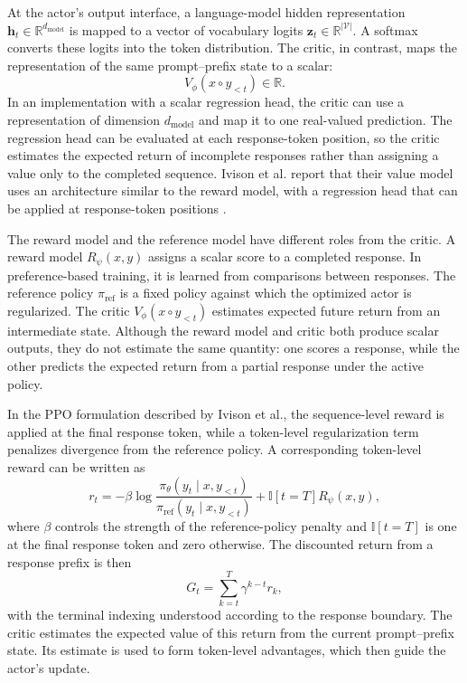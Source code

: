 At the actor's output interface, a language-model hidden representation
\(\mathbf{h}_t\in\mathbb{R}^{d_{\mathrm{model}}}\) is mapped to a vector of
vocabulary logits
\(\mathbf{z}_t\in\mathbb{R}^{|\mathcal{V}|}\). A softmax converts these
logits into the token distribution. The critic, in contrast, maps the
representation of the same prompt--prefix state to a scalar:
\begin{equation}
    V_\phi(x\circ y_{<t})\in\mathbb{R}.
    \label{eq:ac-llm-value}
\end{equation}
In an implementation with a scalar regression head, the critic can use a
representation of dimension \(d_{\mathrm{model}}\) and map it to one
real-valued prediction. The regression head can be evaluated at each
response-token position, so the critic estimates the expected return of
incomplete responses rather than assigning a value only to the completed
sequence. Ivison et al. report that their value model uses an architecture
similar to the reward model, with a regression head that can be applied at
response-token positions \parencite{ivison2024unpacking}.

The reward model and the reference model have different roles from the
critic. A reward model \(R_\psi(x,y)\) assigns a scalar score to a completed
response. In preference-based training, it is learned from comparisons
between responses. The reference policy \(\pi_{\mathrm{ref}}\) is a fixed
policy against which the optimized actor is regularized. The critic
\(V_\phi(x\circ y_{<t})\) estimates expected future return from an
intermediate state. Although the reward model and critic both produce
scalar outputs, they do not estimate the same quantity: one scores a
response, while the other predicts the expected return from a partial
response under the active policy.

In the PPO formulation described by Ivison et al., the sequence-level
reward is applied at the final response token, while a token-level
regularization term penalizes divergence from the reference policy. A
corresponding token-level reward can be written as
\begin{equation}
    r_t
    =
    -\beta
    \log
    \frac{
        \pi_\theta(y_t\mid x,y_{<t})
    }{
        \pi_{\mathrm{ref}}(y_t\mid x,y_{<t})
    }
    +
    \mathbb{I}[t=T]R_\psi(x,y),
    \label{eq:ac-llm-token-reward}
\end{equation}
where \(\beta\) controls the strength of the reference-policy penalty and
\(\mathbb{I}[t=T]\) is one at the final response token and zero otherwise.
The discounted return from a response prefix is then
\begin{equation}
    G_t
    =
    \sum_{k=t}^{T}
    \gamma^{k-t}r_k,
    \label{eq:ac-llm-return}
\end{equation}
with the terminal indexing understood according to the response boundary.
The critic estimates the expected value of this return from the current
prompt--prefix state. Its estimate is used to form token-level advantages,
which then guide the actor's update.


